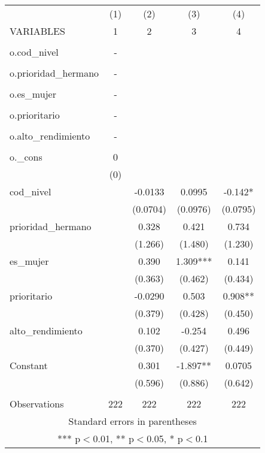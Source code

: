 \documentclass[]{article}
\begin{document}
\begin{tabular}{lcccc} \hline
 & (1) & (2) & (3) & (4) \\
VARIABLES & 1 & 2 & 3 & 4 \\ \hline
 &  &  &  &  \\
o.cod\_nivel & - &  &  &  \\
 &  &  &  &  \\
o.prioridad\_hermano & - &  &  &  \\
 &  &  &  &  \\
o.es\_mujer & - &  &  &  \\
 &  &  &  &  \\
o.prioritario & - &  &  &  \\
 &  &  &  &  \\
o.alto\_rendimiento & - &  &  &  \\
 &  &  &  &  \\
o.\_cons & 0 &  &  &  \\
 & (0) &  &  &  \\
cod\_nivel &  & -0.0133 & 0.0995 & -0.142* \\
 &  & (0.0704) & (0.0976) & (0.0795) \\
prioridad\_hermano &  & 0.328 & 0.421 & 0.734 \\
 &  & (1.266) & (1.480) & (1.230) \\
es\_mujer &  & 0.390 & 1.309*** & 0.141 \\
 &  & (0.363) & (0.462) & (0.434) \\
prioritario &  & -0.0290 & 0.503 & 0.908** \\
 &  & (0.379) & (0.428) & (0.450) \\
alto\_rendimiento &  & 0.102 & -0.254 & 0.496 \\
 &  & (0.370) & (0.427) & (0.449) \\
Constant &  & 0.301 & -1.897** & 0.0705 \\
 &  & (0.596) & (0.886) & (0.642) \\
 &  &  &  &  \\
 Observations & 222 & 222 & 222 & 222 \\ \hline
\multicolumn{5}{c}{ Standard errors in parentheses} \\
\multicolumn{5}{c}{ *** p$<$0.01, ** p$<$0.05, * p$<$0.1} \\
\end{tabular}
\end{document}
